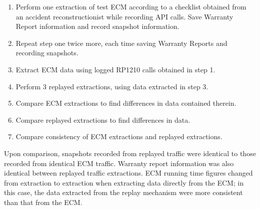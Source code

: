 \begin{enumerate}
  \item Perform one extraction of test ECM according to a checklist obtained from an accident reconstructionist while recording API calls. Save Warranty Report information and record snapshot information.
  \item Repeat step one twice more, each time saving Warranty Reports and recording snapshots.
  \item Extract ECM data using logged RP1210 calls obtained in step 1.
  \item Perform 3 replayed extractions, using data extracted in step 3.
  \item Compare ECM extractions to find differences in data contained therein.
  \item Compare replayed extractions to find differences in data.
  \item Compare consistency of ECM extractions and replayed extractions.
\end{enumerate}


Upon comparison, snapshots recorded from replayed traffic were identical to those recorded from identical ECM traffic. Warranty report information was also identical
between replayed traffic extractions. ECM running time figures changed from extraction to extraction when extracting data directly from the ECM; in this case, the
data extracted from the replay mechanism were more consistent than that from the ECM.


